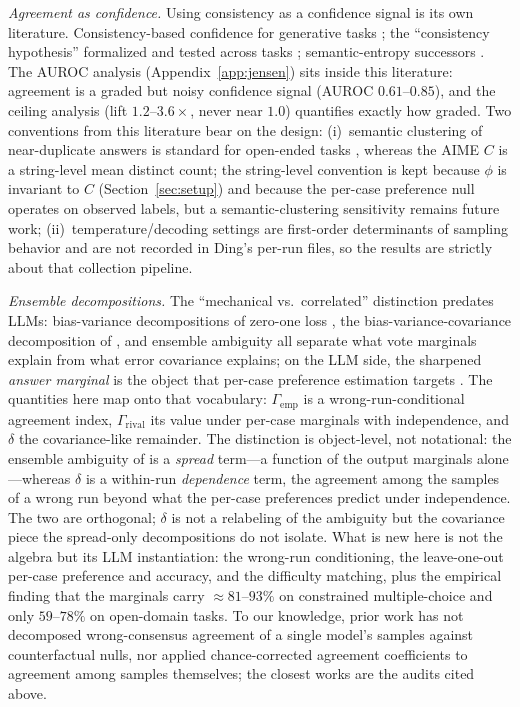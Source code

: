 \documentclass{article}
\newcommand{\agreementIndex}{\Gamma}
\begin{document}
\emph{Agreement as confidence.}
Using consistency as a confidence signal is its own literature.
Consistency-based confidence for generative tasks
\cite{manakul2023,kuhn2023,farquhar2024}; the ``consistency hypothesis'' formalized and tested across tasks \cite{xiao2025}; semantic-entropy successors \cite{nguyen2025}. The AUROC analysis (Appendix~\ref{app:jensen}) sits inside this
literature: agreement is a graded but noisy confidence signal
(AUROC $0.61$--$0.85$), and the ceiling analysis (lift $1.2$--$3.6\times$,
never near $1.0$) quantifies exactly how graded. Two conventions from
this literature bear on the design: (i)~semantic clustering of
near-duplicate answers is standard for open-ended tasks
\cite{kuhn2023,farquhar2024}, whereas the AIME $C$ is a string-level mean distinct count; the string-level convention is kept
because $\phi$ is invariant to $C$ (Section~\ref{sec:setup}) and because
the per-case preference null operates on observed labels, but a
semantic-clustering sensitivity remains future work;
(ii)~temperature/decoding settings are first-order determinants of
sampling behavior and are not recorded in Ding's per-run files, so the results are strictly about that collection pipeline.

\emph{Ensemble decompositions.}
The ``mechanical vs.\ correlated'' distinction predates LLMs: bias-variance
decompositions of zero-one loss \cite{kohavi1996}, the bias-variance-covariance
decomposition of \cite{ueda1996}, and ensemble ambiguity
\cite{krogh1995} all separate what vote marginals explain from what
error covariance explains; on the LLM side, the sharpened \emph{answer marginal} is the object that per-case preference estimation targets \cite{arzhantsev2026}. The quantities here map onto that vocabulary:
$\agreementIndex_{\mathrm{emp}}$ is a wrong-run-conditional agreement index,
$\agreementIndex_{\mathrm{rival}}$ its value under per-case marginals with
independence, and $\delta$ the covariance-like remainder. The distinction is
object-level, not notational: the ensemble ambiguity of \cite{krogh1995} is a
\emph{spread} term---a function of the output marginals alone---whereas
$\delta$ is a within-run \emph{dependence} term, the agreement among the
samples of a wrong run beyond what the per-case preferences predict under
independence. The two are orthogonal; $\delta$ is not a relabeling of the
ambiguity but the covariance piece the spread-only decompositions do not
isolate. What is new
here is not the algebra but its LLM instantiation: the
wrong-run conditioning, the leave-one-out per-case preference and
accuracy, and the difficulty matching, plus the empirical finding that
the marginals carry $\approx81$--$93\%$ on constrained multiple-choice
and only $59$--$78\%$ on open-domain tasks. To our knowledge, prior work has not decomposed wrong-consensus agreement of a single model's samples against counterfactual nulls, nor applied chance-corrected agreement coefficients to agreement among samples themselves; the closest works are the audits cited above.
\end{document}
